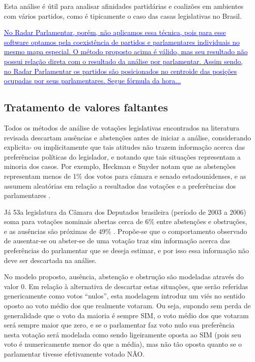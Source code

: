 \documentclass[a4paper, 12pt]{article}
\newcommand{\ins}[1]{\textcolor{blue}{\uline{#1}}} %
\newcommand\todo[1]{\nb{ToDo}{#1}}
\begin{document}
Esta análise é útil para analisar afinidades partidárias e coalizões em ambientes com vários partidos, como é tipicamente o caso das casas legislativas no Brasil.

\ins{No Radar Parlamentar, porém, não aplicamos essa técnica, pois para esse software optamos pela coexistência de partidos e parlamentares individuais no mesmo mapa especial. O método proposto acima é válido, mas seu resultado não possui relação direta com o resultado da análise por parlamentar. Assim sendo, no Radar Parlamentar os partidos são posicionados no centroide das posições ocupadas por seus parlamentares. Segue fórmula da hora...}

\subsection*{Tratamento de valores faltantes}

Todos os métodos de análise de votações legislativas encontrados na literatura revisada descartam ausências e abstenções antes de iniciar a análise, considerando explicita- ou implicitamente que tais atitudes não trazem informação acerca das preferências políticas do legislador, e notando que tais situações representam a minoria dos casos. Por exemplo, Heckman e Snyder notam que as abstenções representam menos de 1\% dos votos para câmara e senado estadounidenses, e as assumem aleatórias em relação a resultados das votações e a preferências dos parlamentares \cite[p.40]{heckman-snyder1997}.

Já 53a legislatura da Câmara dos Deputados brasileira (período de 2003 a 2006) soma para votações nominais abertas cerca de 6\% entre abstenções e obstruções, e as ausências são próximas de 49\% \todo{citar fonte}. Propõe-se que o comportamento observado de ausentar-se ou abster-se de uma votação traz sim informação acerca das preferências do parlamentar que se deseja estimar, e por isso essa informação não deve ser descartada na análise.

No modelo proposto, ausência, abstenção e obstrução são modeladas através do valor 0. Em relação à alternativa de descartar estas situações, que serão referidas genericamente como votos ``nulos'', esta modelagem introduz um viés no sentido oposto ao voto médio dos que realmente votaram. Ou seja, supondo sem perda de generalidade que o voto da maioria é sempre SIM, o voto médio dos que votaram será sempre maior que zero, e se o parlamentar faz voto nulo sua preferência nesta votação será modelada como sendo ligeiramente oposta ao SIM (pois seu voto é numericamente menor do que a média), mas não tão oposta quanto se o parlamentar tivesse efetivamente votado NÃO.
\end{document}
